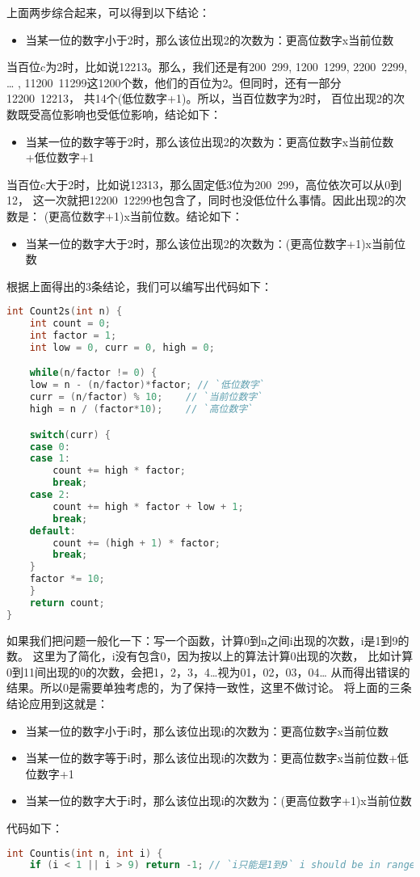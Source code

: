 \begin{description}
上面两步综合起来，可以得到以下结论：
\begin{itemize}
\item 当某一位的数字小于2时，那么该位出现2的次数为：更高位数字x当前位数
\end{itemize}
当百位c为2时，比如说12213。那么，我们还是有200~299, 1200~1299, 2200~2299, … , 11200~11299这1200个数，他们的百位为2。但同时，还有一部分12200~12213， 共14个(低位数字+1)。所以，当百位数字为2时， 百位出现2的次数既受高位影响也受低位影响，结论如下：
\begin{itemize}
\item 当某一位的数字等于2时，那么该位出现2的次数为：更高位数字x当前位数+低位数字+1
\end{itemize}
当百位c大于2时，比如说12313，那么固定低3位为200~299，高位依次可以从0到12， 这一次就把12200~12299也包含了，同时也没低位什么事情。因此出现2的次数是： (更高位数字+1)x当前位数。结论如下：
\begin{itemize}
\item 当某一位的数字大于2时，那么该位出现2的次数为：(更高位数字+1)x当前位数
\end{itemize}
根据上面得出的3条结论，我们可以编写出代码如下：
\begin{lstlisting}[language=C++]
int Count2s(int n) {
    int count = 0;
    int factor = 1;
    int low = 0, curr = 0, high = 0;

    while(n/factor != 0) {
	low = n - (n/factor)*factor; // `低位数字`
	curr = (n/factor) % 10;    // `当前位数字`
	high = n / (factor*10);    // `高位数字`

	switch(curr) {
	case 0:
	case 1:
	    count += high * factor;
	    break;
	case 2:
	    count += high * factor + low + 1;
	    break;
	default:
	    count += (high + 1) * factor;
	    break;
	}
	factor *= 10;
    }
    return count;
}
\end{lstlisting}
如果我们把问题一般化一下：写一个函数，计算0到n之间i出现的次数，i是1到9的数。 这里为了简化，i没有包含0，因为按以上的算法计算0出现的次数， 比如计算0到11间出现的0的次数，会把1，2，3，4…视为01，02，03，04… 从而得出错误的结果。所以0是需要单独考虑的，为了保持一致性，这里不做讨论。 将上面的三条结论应用到这就是：
\begin{itemize}
  \itemsep=-3pt
\item 当某一位的数字小于i时，那么该位出现i的次数为：更高位数字x当前位数
\item 当某一位的数字等于i时，那么该位出现i的次数为：更高位数字x当前位数+低位数字+1
\item 当某一位的数字大于i时，那么该位出现i的次数为：(更高位数字+1)x当前位数
\end{itemize}
代码如下：
\begin{lstlisting}[language=C++]
int Countis(int n, int i) {
    if (i < 1 || i > 9) return -1; // `i只能是1到9` i should be in range [1, 9]


\end{lstlisting}
\end{description}
